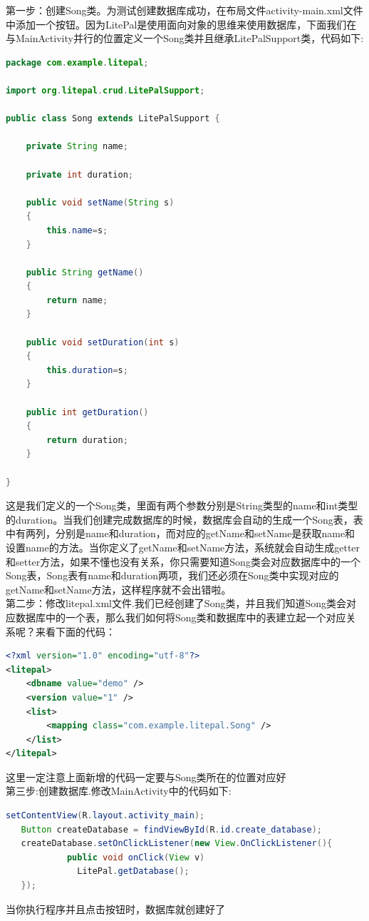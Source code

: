 \documentclass[cs4size,a4paper]{ctexart}
\numberwithin{equation}{section}
\numberwithin{table}{section}
\numberwithin{figure}{section}
\begin{document}
第一步：创建Song类。为测试创建数据库成功，在布局文件activity-main.xml文件中添加一个按钮。因为LitePal是使用面向对象的思维来使用数据库，下面我们在与MainActivity并行的位置定义一个Song类并且继承LitePalSupport类，代码如下:
\begin{lstlisting}[language=java]
package com.example.litepal;

import org.litepal.crud.LitePalSupport;

public class Song extends LitePalSupport {

    private String name;

    private int duration;

    public void setName(String s)
    {
        this.name=s;
    }

    public String getName()
    {
        return name;
    }

    public void setDuration(int s)
    {
        this.duration=s;
    }

    public int getDuration()
    {
        return duration;
    }

}
\end{lstlisting}
这是我们定义的一个Song类，里面有两个参数分别是String类型的name和int类型的duration。当我们创建完成数据库的时候，数据库会自动的生成一个Song表，表中有两列，分别是name和duration，而对应的getName和setName是获取name和设置name的方法。当你定义了getName和setName方法，系统就会自动生成getter和setter方法，如果不懂也没有关系，你只需要知道Song类会对应数据库中的一个Song表，Song表有name和duration两项，我们还必须在Song类中实现对应的getName和setName方法，这样程序就不会出错啦。
~\\

第二步：修改litepal.xml文件.我们已经创建了Song类，并且我们知道Song类会对应数据库中的一个表，那么我们如何将Song类和数据库中的表建立起一个对应关系呢？来看下面的代码：
\begin{lstlisting}[language=xml]
<?xml version="1.0" encoding="utf-8"?>
<litepal>
    <dbname value="demo" />
    <version value="1" />
    <list>
        <mapping class="com.example.litepal.Song" />
    </list>
</litepal>
\end{lstlisting}
这里一定注意上面新增的代码一定要与Song类所在的位置对应好
~\\

第三步:创建数据库.修改MainActivity中的代码如下:
\begin{lstlisting}[language=java]
   setContentView(R.layout.activity_main);
   Button createDatabase = findViewById(R.id.create_database);
   createDatabase.setOnClickListener(new View.OnClickListener(){
            public void onClick(View v)
              LitePal.getDatabase();
   });
\end{lstlisting}
当你执行程序并且点击按钮时，数据库就创建好了
~\\
\end{document}
